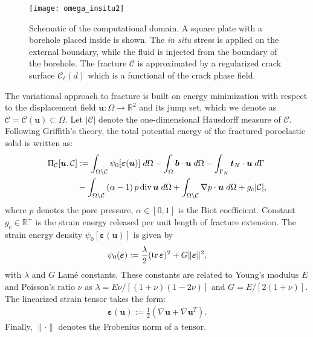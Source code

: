 \begin{figure}[htbp]
    \centering
    \texttt{[image: omega\_insitu2]}
    \caption{Schematic of the computational domain. A square plate with a borehole placed inside is shown. The \emph{in situ} stress is applied on the external boundary, while the fluid is injected from the boundary of the borehole. The fracture $\mathcal{C}$ is approximated by a regularized crack surface $\mathcal{C}_{\ell}(d)$ which is a functional of the crack phase field.}
    \label{Fig:compute_domain}
\end{figure}


The variational approach to fracture is built on energy minimization with respect to the displacement field $\bm{u}:\Omega\rightarrow\mathbb{R}^2$ and its jump set, which we denote as $\mathcal{C}=\mathcal{C}(\bm{u})\subset\Omega$. Let $|\mathcal{C}|$ denote the one-dimensional Hausdorff measure of $\mathcal{C}$. Following Griffith's theory, the total potential energy of the fractured poroelastic solid is written as:
\begin{equation}\label{Eq:Pi}
    \begin{aligned}
        \Pi_{\mathcal{C}}[\bm{u},\mathcal{C}] &:= \int_{\Omega\setminus\mathcal{C}} \psi_0[\bm{\varepsilon}(\bm{u})] \; d\Omega
	    - \int_{\Omega} \bm{b} \cdot \bm{u} \; d\Omega
	    - \int_{\Gamma_N} \bm{t}_N\cdot \bm{u} \; d\Gamma \\
	    &- \int_{\Omega\setminus\mathcal{C}} \left(\alpha - 1\right)p\operatorname{div}\bm{u}\; d\Omega + 
	    \int_{\Omega\setminus\mathcal{C}}\nabla p\cdot \bm{u}\; d\Omega + g_c|\mathcal{C}|,\\
    \end{aligned}
\end{equation}
where $p$ denotes the pore pressure, $\alpha\in[0,1]$ is the Biot coefficient. {Constant} $g_c\in\mathbb{R}^+$ is the strain energy released per unit length of fracture extension. {The strain energy density $\psi_0[\bm{\varepsilon}(\bm{u})]$ is given by}
\begin{equation*}%
    \begin{aligned}
        \psi_0(\bm{\varepsilon}) := \frac{\lambda}{2} (\trace \bm{\varepsilon})^2 + G \|\bm{\varepsilon}\|^2,
    \end{aligned}
\end{equation*}
with $\lambda$ and $G$ Lam\'e constants. These constants are related to Young's modulus $E$ and Poisson's ratio $\nu$ as $\lambda=E\nu/[(1+\nu)(1-2\nu)]$ and $G=E/[2(1+\nu)]$.
The linearized strain tensor takes the form:
\begin{equation*}
    \begin{aligned}
        \bm{\varepsilon}(\bm{u}) := 
        \frac{1}{2}\left(\nabla\bm{u}+\nabla\bm{u}^T\right).
    \end{aligned}
\end{equation*}
Finally, $\|\cdot\|$ denotes the Frobenius norm of a tensor.

